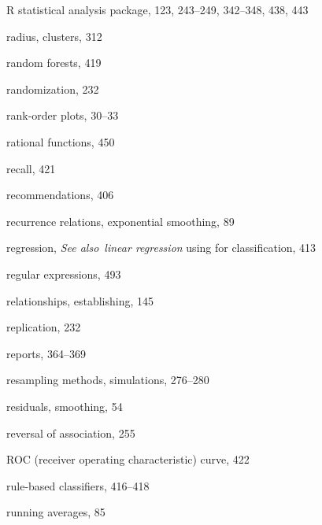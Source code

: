 \documentclass{Oreilly5980006}
\def\seealso{{\it See also}\ }
\def\see#1{{\it See software}}
\begin{document}
\begin{theindex}
  \item R statistical analysis package, 123, 243--249, 342--348, 438, 
		443
  \item radius, clusters, 312
  \item random forests, 419
  \item randomization, 232
  \item rank-order plots, 30--33
  \item rational functions, 450
  \item recall, 421
  \item recommendations, 406
  \item recurrence relations, exponential smoothing, 89
  \item regression, \seealso{\it linear regression} %
    \subitem using for classification, 413
  \item regular expressions, 493
  \item relationships, establishing, 145
  \item replication, 232
  \item reports, 364--369
  \item resampling methods, simulations, 276--280
  \item residuals, smoothing, 54
  \item reversal of association, 255
  \item ROC (receiver operating characteristic) curve, 422
  \item rule-based classifiers, 416--418
  \item running averages, 85

  \indexspace


\end{theindex}
\end{document}
